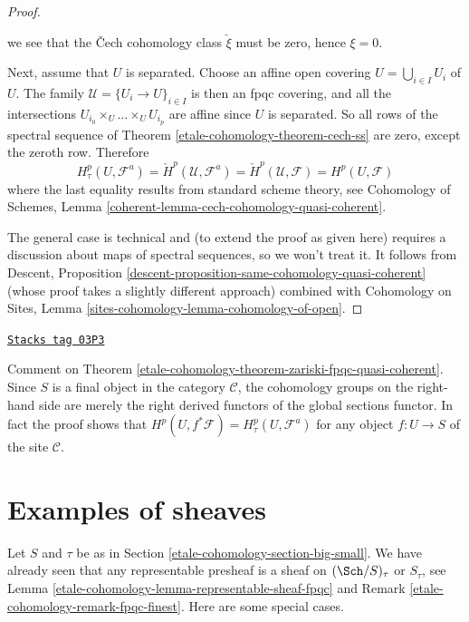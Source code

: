 \begin{proof}
\begin{enumerate}
we see that the {\v C}ech cohomology class $\check \xi$ must be zero,
hence $\xi = 0$.
\end{enumerate}
Next, assume that $U$ is separated. Choose an affine open covering
$U = \bigcup_{i \in I} U_i$ of $U$. The family
$\mathcal{U} = \{U_i \to U\}_{i \in I}$ is then an fpqc covering,
and all the intersections
$U_{i_0} \times_U \ldots \times_U U_{i_p}$ are affine
since $U$ is separated. So all rows of the spectral sequence of
Theorem \ref{etale-cohomology-theorem-cech-ss}
are zero, except the zeroth row. Therefore
$$
H^p_\tau(U, \mathcal{F}^a) =
\check H^p(\mathcal{U}, \mathcal{F}^a) =
\check H^p(\mathcal{U}, \mathcal{F}) = H^p(U, \mathcal{F})
$$
where the last equality results from standard scheme theory, see
Cohomology of Schemes, Lemma
\ref{coherent-lemma-cech-cohomology-quasi-coherent}.

\medskip\noindent
The general case is technical and (to extend the proof as given here)
requires a discussion about maps of spectral sequences, so we won't treat it.
It follows from
Descent, Proposition \ref{descent-proposition-same-cohomology-quasi-coherent}
(whose proof takes a slightly different approach) combined with
Cohomology on Sites, Lemma \ref{sites-cohomology-lemma-cohomology-of-open}.
\end{proof}

\begin{remark}
\label{etale-cohomology-remark-right-derived-global-sections}
\href{https://stacks.math.columbia.edu/tag/03P3}{\texttt{Stacks tag 03P3}}

Comment on Theorem \ref{etale-cohomology-theorem-zariski-fpqc-quasi-coherent}.
Since $S$ is a final object in the category $\mathcal{C}$, the cohomology
groups on the right-hand side are merely the right derived functors of the
global sections functor. In fact the proof shows that
$H^p(U, f^*\mathcal{F}) = H^p_\tau(U, \mathcal{F}^a)$
for any object $f : U \to S$ of the site $\mathcal{C}$.
\end{remark}

\section{Examples of sheaves}
\label{etale-cohomology-section-examples-sheaves}
Let $S$ and $\tau$ be as in Section \ref{etale-cohomology-section-big-small}.
We have already seen that any representable presheaf is a sheaf on
$(\Sch/S)_\tau$ or $S_\tau$, see
Lemma \ref{etale-cohomology-lemma-representable-sheaf-fpqc}
and
Remark \ref{etale-cohomology-remark-fpqc-finest}.
Here are some special cases.

